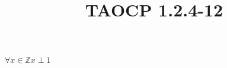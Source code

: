 \documentclass{article}
\title{TAOCP 1.2.4\mbox{-}12}
\begin{document}
\maketitle

\( \forall x \in \mathbb{Z} x \perp 1 \)
\end{document}
